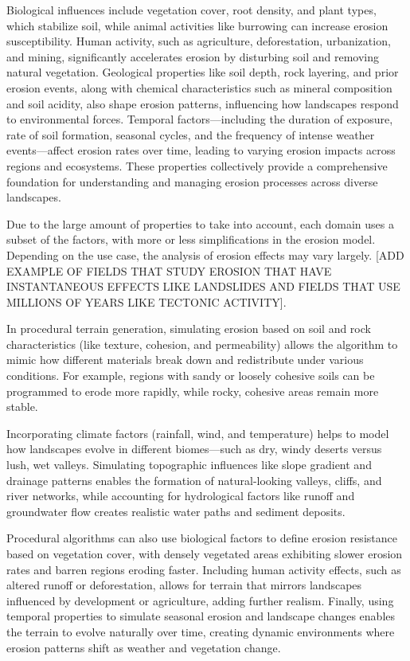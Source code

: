 Biological influences include vegetation cover, root density, and plant types, which stabilize soil, while animal activities like burrowing can increase erosion susceptibility. Human activity, such as agriculture, deforestation, urbanization, and mining, significantly accelerates erosion by disturbing soil and removing natural vegetation. Geological properties like soil depth, rock layering, and prior erosion events, along with chemical characteristics such as mineral composition and soil acidity, also shape erosion patterns, influencing how landscapes respond to environmental forces. Temporal factors—including the duration of exposure, rate of soil formation, seasonal cycles, and the frequency of intense weather events—affect erosion rates over time, leading to varying erosion impacts across regions and ecosystems. These properties collectively provide a comprehensive foundation for understanding and managing erosion processes across diverse landscapes.

Due to the large amount of properties to take into account, each domain uses a subset of the factors, with more or less simplifications in the erosion model. Depending on the use case, the analysis of erosion effects may vary largely. [ADD EXAMPLE OF FIELDS THAT STUDY EROSION THAT HAVE INSTANTANEOUS EFFECTS LIKE LANDSLIDES AND FIELDS THAT USE MILLIONS OF YEARS LIKE TECTONIC ACTIVITY].

In procedural terrain generation, simulating erosion based on soil and rock characteristics (like texture, cohesion, and permeability) allows the algorithm to mimic how different materials break down and redistribute under various conditions. For example, regions with sandy or loosely cohesive soils can be programmed to erode more rapidly, while rocky, cohesive areas remain more stable.

Incorporating climate factors (rainfall, wind, and temperature) helps to model how landscapes evolve in different biomes—such as dry, windy deserts versus lush, wet valleys. Simulating topographic influences like slope gradient and drainage patterns enables the formation of natural-looking valleys, cliffs, and river networks, while accounting for hydrological factors like runoff and groundwater flow creates realistic water paths and sediment deposits.

Procedural algorithms can also use biological factors to define erosion resistance based on vegetation cover, with densely vegetated areas exhibiting slower erosion rates and barren regions eroding faster. Including human activity effects, such as altered runoff or deforestation, allows for terrain that mirrors landscapes influenced by development or agriculture, adding further realism. Finally, using temporal properties to simulate seasonal erosion and landscape changes enables the terrain to evolve naturally over time, creating dynamic environments where erosion patterns shift as weather and vegetation change.





